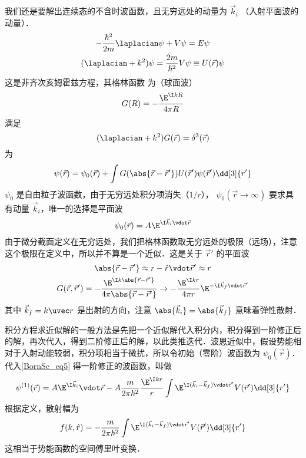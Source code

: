
我们还是要解出连续态的不含时波函数，且无穷远处的动量为 $\vec k_i$ （入射平面波的动量）．
\begin{gather}
-\frac{\hbar^2}{2m} \laplacian\psi  + V\psi  = E\psi \\
(\laplacian + k^2)\psi  = \frac{2m}{\hbar^2} V\psi  \equiv U(\vec r)\psi
\end{gather}
这是非齐次亥姆霍兹方程，其格林函数%
为（球面波）
\begin{equation}
G(R) =  -\frac{\E^{\I kR}}{4\pi R}
\end{equation}
满足
\begin{equation}
(\laplacian + k^2)G(\vec r) = \delta^3(\vec r)
\end{equation}
为
\begin{equation}\label{BornSc_eq5}
\psi(\vec r) = \psi_0(\vec r) + \int G(\abs{\vec r - \vec r'})U(\vec r')\psi (\vec r') \dd[3]{r'}
\end{equation}
$\psi_0$ 是自由粒子波函数，由于无穷远处积分项消失（$1/r$）， $\psi_0(\vec r\to\infty)$ 要求具有动量 $\vec k_i$，唯一的选择是平面波
\begin{equation}
\psi_0(\vec r) = A\E^{\I\vec k_i \vdot \vec r}
\end{equation}
由于微分截面定义在无穷远处，我们把格林函数取无穷远处的极限（远场），注意这个极限在定义中，所以并不算是一个近似．这是关于 $\vec r'$ 的平面波
\begin{gather}
\abs{\vec r - \vec r'} \approx r - \hat r \vdot \vec r' \approx r\\
G(\vec r, \vec r') =  - \frac{\E^{\I k \abs{\vec r - \vec r'}}}{4\pi\abs{\vec r - \vec r'}} \to  - \frac{\E^{\I kr}}{4\pi r} \E^{-\I \vec k_f \vdot \vec r'}
\end{gather}
其中 $\vec k_f = k\uvec r$ 是出射的方向，注意 $\abs{\vec k_i} = \abs{\vec k_f}$ 意味着弹性散射．

积分方程求近似解的一般方法是先把一个近似解代入积分内，积分得到一阶修正后的解，再次代入，得到二阶修正后的解，以此类推迭代．波恩近似中，假设势能相对于入射动能较弱，积分项相当于微扰，所以令初始（零阶）波函数为 $\psi_0(\vec r)$．代入\autoref{BornSc_eq5} 得一阶修正的波函数，叫做
\begin{equation}
\psi ^{(1)}(\vec r) = A\E^{\I\vec k_i} \vdot \vec r - A \frac{m}{2\pi\hbar^2} \frac{\E^{\I kr}}{r}\int \E^{\I (\vec k_i - \vec k_f) \vdot \vec r'} V(\vec r') \dd[3]{r'}
\end{equation}
根据定义，散射幅为
\begin{equation}
f(k, \hat r) =  - \frac{m}{2\pi\hbar^2} \int \E^{\I (\vec k_i - \vec k_f) \vdot \vec r'} V(\vec r') \dd[3]{r'}
\end{equation}
这相当于势能函数的空间傅里叶变换．

